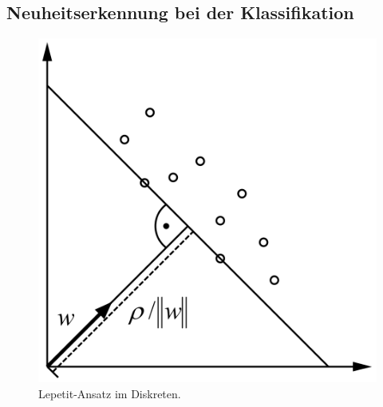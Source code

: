 \documentclass[11pt]{article}
\begin{document}
\subsection{Neuheitserkennung bei der Klassifikation}

\begin{figure}[h!]
    \centering
    \includegraphics[scale=0.3]{images/svm.png}
    \caption{Lepetit-Ansatz im Diskreten.}
    \label{fig:svm}
\end{figure}
\end{document}
